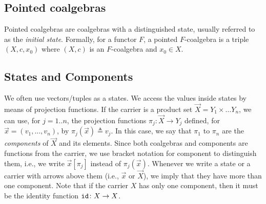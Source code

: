 \subsection{Pointed coalgebras}
Pointed coalgebras are coalgebras with a distinguished state, usually referred to as the \emph{initial state}. Formally, for a functor $F$, a pointed $F$-coalgebra is a triple $(X,c, x_0)$ where $(X,c)$ is an $F$-coalgebra and $x_0\in X$.
\subsection{States and Components}
We often use vectors/tuples as a states. We access the values inside states by means of projection functions. If the carrier is a product set $\vec{X}=Y_1 \times\ldots Y_n$, we can use, for $j=1..n$, the projection functions $\pi_j\colon \vec{X}\rightarrow Y_j$ defined, for $\vec{x}=(v_1,\ldots,v_n)$, by $\pi_j(\vec{x})\triangleq v_j$. In this case, we say that $\pi_1$ to $\pi_n$ are the \emph{components} of $\vec{X}$ and its elements. Since both coalgebras and components are functions from the carrier, we use bracket notation for component to distinguish them, i.e., we write $\vec{x}[\pi_j]$ instead of $\pi_j(\vec{x})$.  %
Whenever we write a state or a carrier  with arrows above them (i.e., $\vec{x}$ or $\vec{X}$), we imply that they have more than one component. Note that if the carrier $X$ has only one component, then it must be the identity function ${\texttt{id}}\colon X\rightarrow X$. 
%
